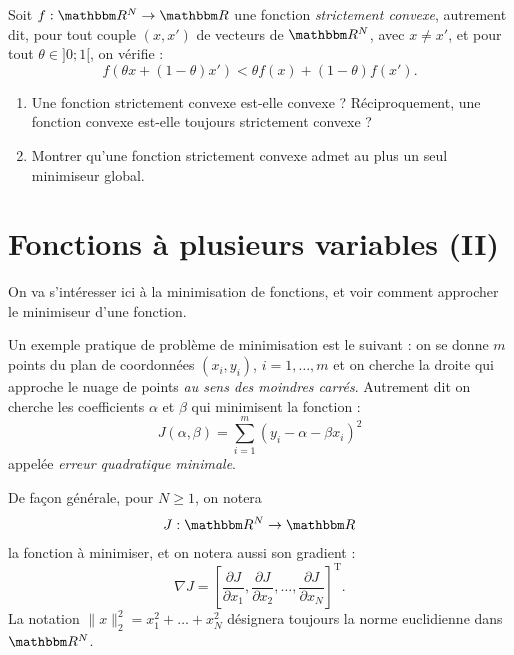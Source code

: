 \medskip

\begin{exercice}

Soit $f : \eR^N \rightarrow \eR$ une fonction \emph{strictement convexe}, autrement dit, pour tout couple $(x,x')$ de vecteurs de $\eR^N$, avec $x\neq x'$, et pour tout $\theta \in ]0;1[$, on vérifie :
\[
f( \theta x + (1-\theta) x' ) < \theta f(x) + (1-\theta) f(x').
\]

\begin{enumerate}

\item Une fonction strictement convexe est-elle convexe ? Réciproquement, une fonction convexe est-elle toujours strictement convexe ?

\item Montrer qu'une fonction strictement convexe admet au plus un seul minimiseur global.

\end{enumerate}

\end{exercice}

\newpage

\section{Fonctions à plusieurs variables (II)}

On va s'intéresser ici à la minimisation de fonctions, et voir comment approcher le minimiseur d'une fonction.

\medskip

Un exemple pratique de problème de minimisation est le suivant : on se donne $m$ points du plan de coordonnées $(x_i,y_i)$, $i=1,\ldots,m$ et on cherche la droite qui approche le nuage de points \emph{au sens des moindres carrés}. Autrement dit on cherche les coefficients $\alpha$ et $\beta$ qui minimisent la fonction :
\begin{equation} \label{moindre_carres}
J(\alpha,\beta) = \sum_{i=1}^m ( y_i - \alpha - \beta x_i )^2
\end{equation}
appelée \emph{erreur quadratique minimale}.

\medskip

De façon générale, pour $N \geq 1$, on notera 
\[
J : \eR^N \rightarrow \eR
\]
la fonction à minimiser, et on notera aussi son gradient :
\[
\nabla J = \left [ \frac{\partial J}{\partial x_1} , 
\frac{\partial J}{\partial x_2} , \ldots , \frac{\partial J}{\partial x_N} \right ]^\mathrm{T}.
\]
La notation $\| x \|_2^2 = x_1^2 + \ldots + x_N^2$ désignera toujours la norme euclidienne dans $\eR^N$.

